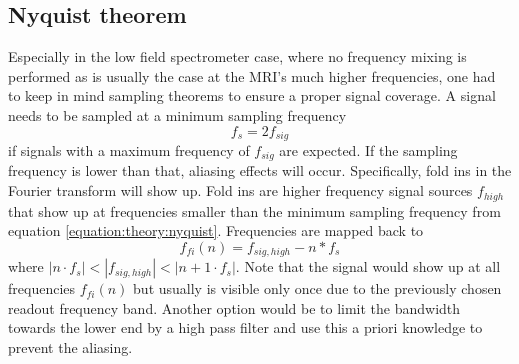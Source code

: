             \subsection{Nyquist theorem}
            Especially in the low field spectrometer case, where no frequency mixing is performed as is usually the case at the MRI's much higher frequencies, one had to keep in mind sampling theorems to ensure a proper signal coverage. A signal needs to be sampled at a minimum sampling frequency \cite{shannon_mathematical_1948}
                \begin{equation}
                    \label{equation:theory:nyquist}
                    f_{s} = 2 f_{sig}
                \end{equation}
                if signals with a maximum frequency of $f_{sig}$ are expected. If the sampling frequency is lower than that, aliasing effects will occur. Specifically, fold ins in the Fourier transform will show up. Fold ins are higher frequency signal sources $f_{high}$ that show up at frequencies smaller than the minimum sampling frequency from equation \ref{equation:theory:nyquist}. Frequencies are mapped back to
                \begin{equation}
                    f_{fi}(n) = f_{sig,high} - n * f_s
                \end{equation}
                where $|n\cdot f_s| < |f_{sig,high}| < |n+1 \cdot f_s|$. Note that the signal would show up at all frequencies $f_{fi}(n)$ but usually is visible only once due to the previously chosen readout frequency band.
                Another option would be to limit the bandwidth towards the lower end by a high pass filter and use this a priori knowledge to prevent the aliasing.
